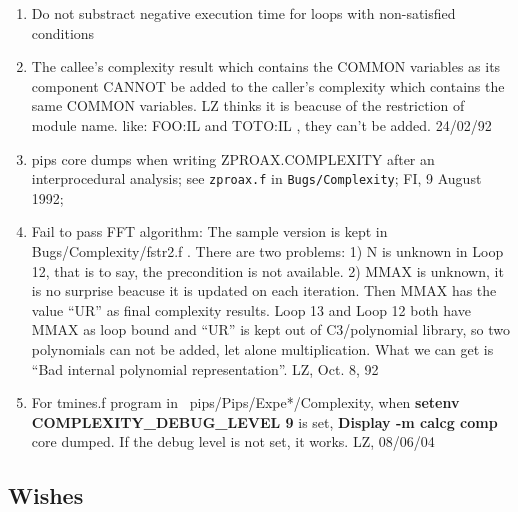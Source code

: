 \begin{enumerate}

  \item Do not substract negative execution time for loops with
        non-satisfied conditions

  \item The callee's complexity result which contains the COMMON
        variables as its component CANNOT be added to the caller's
        complexity which contains the same COMMON variables.
        LZ thinks it is beacuse of the restriction of module name.
        like: FOO:IL and TOTO:IL , they can't be added. 24/02/92

  \item pips core dumps when writing ZPROAX.COMPLEXITY after an
        interprocedural analysis;
        see \verb+zproax.f+ in \verb+Bugs/Complexity+;
        FI, 9 August 1992;

  \item Fail to pass FFT algorithm:
        The sample version is kept in Bugs/Complexity/fstr2.f .
        There are two problems: 1) N is unknown in Loop 12, that is to
        say, the precondition is not available.
        2) MMAX is unknown, it is no surprise beacuse it is updated
        on each iteration. Then MMAX has the value ``UR'' as final
        complexity results. Loop 13 and Loop 12 both have MMAX as 
        loop bound and ``UR'' is kept out of C3/polynomial library,
        so two polynomials can not be added, let alone multiplication.
        What we can get is ``Bad internal polynomial representation''.
        LZ, Oct. 8, 92

  \item For tmines.f program in ~pips/Pips/Expe*/Complexity,
        when {\bf setenv COMPLEXITY\_DEBUG\_LEVEL 9} is set,
        {\bf Display -m calcg comp} core dumped.
        If the debug level is not set, it works.
        LZ, 08/06/04

\end{enumerate}

\subsection{Wishes}


